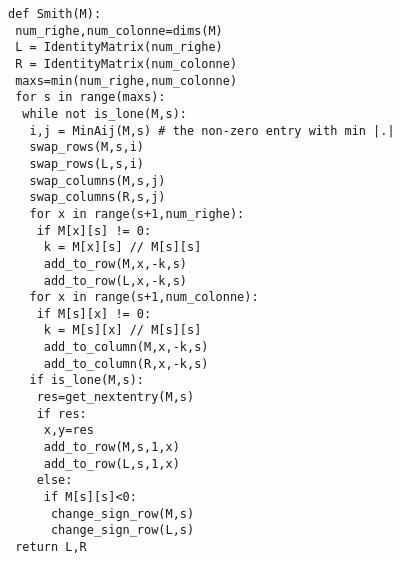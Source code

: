 \documentclass[12pt,a4paper]{article}
\theoremstyle{definition}
\begin{document}
\begin{lstlisting}[language=iPython]
def Smith(M):
 num_righe,num_colonne=dims(M)
 L = IdentityMatrix(num_righe)
 R = IdentityMatrix(num_colonne)
 maxs=min(num_righe,num_colonne)
 for s in range(maxs):
  while not is_lone(M,s):
   i,j = MinAij(M,s) # the non-zero entry with min |.|
   swap_rows(M,s,i)
   swap_rows(L,s,i)
   swap_columns(M,s,j)
   swap_columns(R,s,j)
   for x in range(s+1,num_righe):
    if M[x][s] != 0:
     k = M[x][s] // M[s][s]
     add_to_row(M,x,-k,s)
     add_to_row(L,x,-k,s)
   for x in range(s+1,num_colonne):
    if M[s][x] != 0:
     k = M[s][x] // M[s][s]
     add_to_column(M,x,-k,s)
     add_to_column(R,x,-k,s)
   if is_lone(M,s):
    res=get_nextentry(M,s)
    if res:
     x,y=res
     add_to_row(M,s,1,x)
     add_to_row(L,s,1,x)
    else:
     if M[s][s]<0:
      change_sign_row(M,s)
      change_sign_row(L,s)
 return L,R
\end{lstlisting}\ \\
\end{document}
